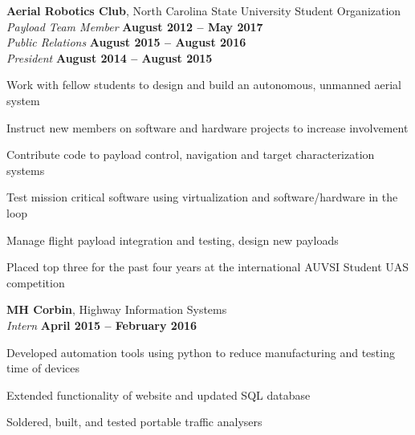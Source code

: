 \documentclass[margin,line]{resume}
\begin{document}
\begin{resume}
    \textbf{Aerial Robotics Club}, North Carolina State University Student Organization\\
    \textsl{Payload Team Member} \hfill \textbf{August 2012 -- May 2017}\\
    \textsl{Public Relations} \hfill \textbf{August 2015 -- August 2016}\\
    \textsl{President} \hfill \textbf{August 2014 -- August 2015}\\
    \vspace{-3mm}
    \begin{list2}
    \item Work with fellow students to design and build an autonomous, unmanned aerial system
    \item Instruct new members on software and hardware projects to increase involvement
    \item Contribute code to payload control, navigation and target characterization systems
    \item Test mission critical software using virtualization and software/hardware in the loop
	\item Manage flight payload integration and testing, design new payloads
    \item Placed top three for the past four years at the international AUVSI Student UAS competition
    \end{list2}
    \vspace{3mm}




    \textbf{MH Corbin}, Highway Information Systems\\
    \textsl{Intern}  \hfill \textbf{April 2015 -- February 2016} \\
    \vspace{-4mm}
    \begin{list2}
    \item Developed automation tools using python to reduce manufacturing and testing time of devices
    \item Extended functionality of website and updated SQL database
    \item Soldered, built, and tested portable traffic analysers
    \end{list2}
    \vspace{3mm}




\end{resume}
\end{document}
